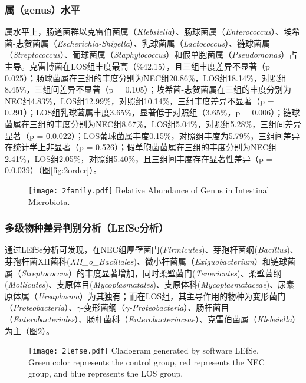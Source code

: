 {{    \subsubsection{属（genus）水平}
    属水平上，肠道菌群以克雷伯菌属（\textit{Klebsiella}）、肠球菌属（\textit{Enterococcus}）、埃希菌-志贺菌属（\textit{Escherichia-Shigella}）、乳球菌属（\textit{Lactococcus}）、链球菌属（\textit{Streptococcus}）、葡球菌属（\textit{Staphylococcus}）和假单胞菌属（\textit{Pseudomonas}）占主导。克雷博菌在LOS组丰度最高（\%42.15），且三组丰度差异不显著（p = 0.025）；肠球菌属在三组的丰度分别为NEC组20.86\%，LOS组18.14\%，对照组8.45\%，三组间差异不显著（p = 0.105）；埃希菌-志贺菌属在三组的丰度分别为NEC组4.83\%，LOS组12.99\%，对照组10.14\%，三组丰度差异不显著（p = 0.291）；LOS组乳球菌属丰度3.65\%，显著低于对照组（3.65\%，p = 0.006）；链球菌属在三组的丰度分别为NEC组8.67\%，LOS组5.04\%，对照组5.28\%，三组间差异显著（p = 0.0.022）；LOS葡球菌属丰度0.15\%，对照组丰度为5.79\%，三组间差异在统计学上非显著（p = 0.526）；假单胞菌菌属在三组的丰度分别为NEC组2.41\%，LOS组2.05\%，对照组5.40\%，且三组间丰度存在显著性差异（p = 0.0.039）（图\ref{fig:2order}）。
      \begin{figure}[!htp]
        \centering
        \texttt{[image: 2family.pdf]}
          {Relative Abundance of Genus in Intestinal Microbiota.}
        \label{fig:2genus}
      \end{figure}

      \subsubsection{多级物种差异判别分析（LEfSe分析）}
      通过LEfSe分析可发现，在NEC组厚壁菌门(\textit{Firmicutes})、芽孢杆菌纲(\textit{Bacillus})、芽孢杆菌XII菌科(\textit{XII\_o\_Bacillales})、微小杆菌属（\textit{Exiguobacterium}）和链球菌属（\textit{Streptococcus}）的丰度显著增加，同时柔壁菌门(\textit{Tenericutes})、柔壁菌纲(\textit{Mollicutes})、支原体目(\textit{Mycoplasmatales})、支原体科(\textit{Mycoplasmataceae})、尿素原体属（\textit{Ureaplasma}）为其独有；而在LOS组，其主导作用的物种为变形菌门（\textit{Proteobacteria}）、$\gamma$-变形菌纲（\textit{$\gamma$-Proteobacteria}）、肠杆菌目（\textit{Enterobacteriales}）、肠杆菌科（\textit{Enterobacteriaceae}）、克雷伯菌属（\textit{Klebsiella}）为主（图\ref{fig:2lefse}）。
        \begin{figure}[!htp]
          \centering
          \texttt{[image: 2lefse.pdf]}
            {Cladogram generated by software LEfSe. Green color represents the control group, red represents the NEC group, and blue represents the LOS group.}
          \label{fig:2lefse}
        \end{figure}

}}

